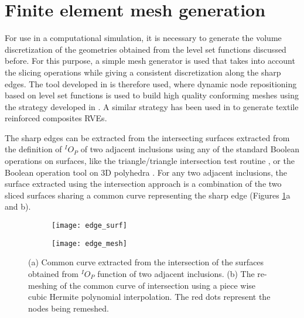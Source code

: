 \section{Finite element mesh generation}\label{of-fem}

For use in a computational simulation, it is necessary to generate the volume discretization of the geometries obtained from the level set functions discussed before. For this purpose, a simple mesh generator is used that takes into account the slicing operations while giving a consistent discretization along the sharp edges. The tool developed in \cite{ehabmoustafakamelIntegratedApproachConformal2019} is therefore used, where dynamic node repositioning based on level set functions is used to build high quality conforming meshes using the strategy developed in \cite{perssonSimpleMeshGenerator2004}. A similar strategy has been used in \cite{wintibaAutomatedProcedureGeneration2017} to generate textile reinforced composites RVEs.

The sharp edges can be extracted from the intersecting surfaces extracted from the definition of $ ^IO_P $ of two adjacent inclusions using any of the standard Boolean operations on surfaces, like the triangle/triangle intersection test routine \cite{mollerFastTriangleTriangleIntersection1997}, or the Boolean operation tool on 3D polyhedra \cite{bernsteinFastExactLinear2009}. For any two adjacent inclusions, the surface extracted using the intersection approach is a combination of the two sliced surfaces sharing a common curve representing the sharp edge (Figures \ref{intersect2}a and b). 

\begin{figure}
	\centering
	\begin{subfigure}[b]{0.35\textwidth}
		\texttt{[image: edge\_surf]}
		\caption{}
	\end{subfigure}
	\begin{subfigure}[b]{0.62\textwidth}
		\texttt{[image: edge\_mesh]}
		\caption{}
	\end{subfigure}
	\caption{(a) Common curve extracted from the intersection of the surfaces obtained from $ ^IO_P $ function of two adjacent inclusions. (b) The re-meshing of the common curve of intersection using a piece wise cubic Hermite polynomial interpolation. The red dots represent the nodes being remeshed.}\label{intersect2}
\end{figure}

